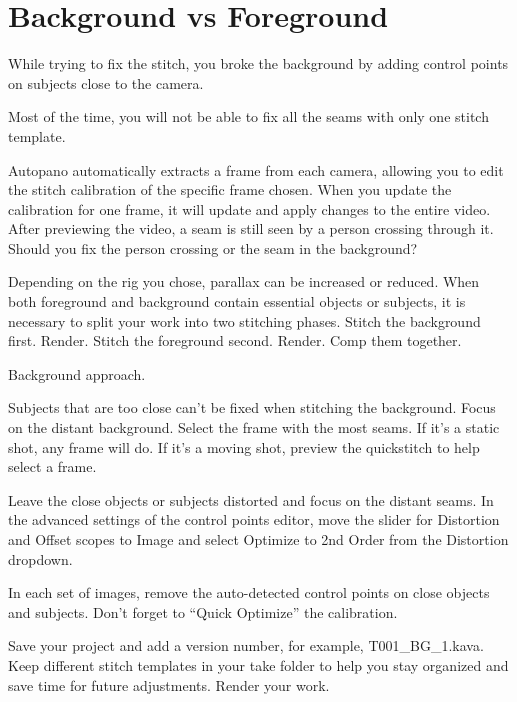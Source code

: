 \chapter{Background vs Foreground}
\pagecolor{white}
\label{chap:34}
\begin{fullwidth}

\problem

{\large While trying to fix the stitch, you broke the background by adding control points on subjects close to the camera. \par}

Most of the time, you will not be able to fix all the seams with only one stitch template. 

Autopano automatically extracts a frame from each camera, allowing you to edit the stitch calibration of the specific frame chosen. When you update the calibration for one frame, it will update and apply changes to the entire video. After previewing the video, a seam is still seen by a person crossing through it. Should you fix the person crossing or the seam in the background?


\clearpage
\solutions

Depending on the rig you chose, parallax can be increased or reduced. When both foreground and background contain essential objects or subjects, it is necessary to split your work into two stitching phases. Stitch the background first. Render. Stitch the foreground second. Render. Comp them together.

{\large Background approach. \par}

Subjects that are too close can’t be fixed when stitching the background. Focus on the distant background. Select the frame with the most seams. If it’s a static shot, any frame will do. If it’s a moving shot, preview the quickstitch to help select a frame. 

Leave the close objects or subjects distorted and focus on the distant seams. In the advanced settings of the control points editor, move the slider for Distortion and Offset scopes to Image and select Optimize to 2nd Order from the Distortion dropdown. 

\clearpage
In each set of images, remove the auto-detected control points on close objects and subjects. Don’t forget to “Quick Optimize” the calibration. 


Save your project and add a version number, for example, T001\_BG\_1.kava. Keep different stitch templates in your take folder to help you stay organized and save time for future adjustments. Render your work.


\end{fullwidth}
